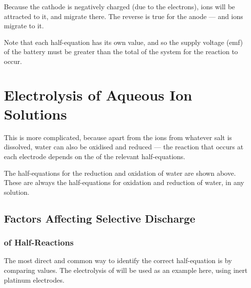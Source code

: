 		Because the cathode is negatively charged (due to the electrons),  ions will be attracted
		to it, and migrate there. The reverse is true for the anode --- and \ch{\Cl-} ions migrate to it.

		Note that each half-equation has its own \Eo{} value, and so the supply voltage (emf) of the battery must be greater than the total
		\Ecell{} of the system for the reaction to occur.




	\pagebreak
	\section{Electrolysis of Aqueous Ion Solutions}

		This is more complicated, because apart from the ions from whatever salt is dissolved, water can also be oxidised and reduced --- the
		reaction that occurs at each electrode depends on the \Eo{} of the relevant half-equations.


		The half-equations for the reduction and oxidation of water are shown above. These are always the half-equations for oxidation and
		reduction of water, in any solution.

		\subsection{Factors Affecting Selective Discharge}

			\subsubsection{\texorpdfstring{\Eo{}}{Eo} of Half-Reactions}

				The most direct and common way to identify the correct half-equation is by comparing \Eo{} values.
				The electrolysis of  will be used as an example here, using inert platinum electrodes.


